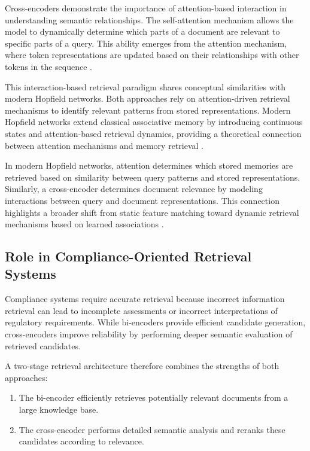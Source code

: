 Cross-encoders demonstrate the importance of attention-based interaction in understanding semantic relationships. The self-attention mechanism allows the model to dynamically determine which parts of a document are relevant to specific parts of a query. This ability emerges from the attention mechanism, where token representations are updated based on their relationships with other tokens in the sequence \cite{vaswani2017attention}.

This interaction-based retrieval paradigm shares conceptual similarities with modern Hopfield networks. Both approaches rely on attention-driven retrieval mechanisms to identify relevant patterns from stored representations. Modern Hopfield networks extend classical associative memory by introducing continuous states and attention-based retrieval dynamics, providing a theoretical connection between attention mechanisms and memory retrieval \cite{ramsauer2021hopfield}.

In modern Hopfield networks, attention determines which stored memories are retrieved based on similarity between query patterns and stored representations. Similarly, a cross-encoder determines document relevance by modeling interactions between query and document representations. This connection highlights a broader shift from static feature matching toward dynamic retrieval mechanisms based on learned associations \cite{ramsauer2021hopfield}.

\subsection{Role in Compliance-Oriented Retrieval Systems}

Compliance systems require accurate retrieval because incorrect information retrieval can lead to incomplete assessments or incorrect interpretations of regulatory requirements. While bi-encoders provide efficient candidate generation, cross-encoders improve reliability by performing deeper semantic evaluation of retrieved candidates.

A two-stage retrieval architecture therefore combines the strengths of both approaches:

\begin{enumerate}
    \item The bi-encoder efficiently retrieves potentially relevant documents from a large knowledge base.
    \item The cross-encoder performs detailed semantic analysis and reranks these candidates according to relevance.
\end{enumerate}

